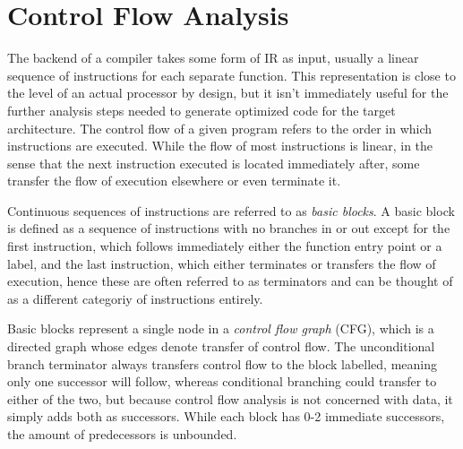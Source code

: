 \documentclass{article}
\begin{document}
\section{Control Flow Analysis}



The backend of a compiler takes some form of IR as input, usually a linear sequence of instructions for each separate function. This representation is close to the level of an actual processor by design, but it isn't immediately useful for the further analysis steps needed to generate optimized code for the target architecture. %
The control flow of a given program refers to the order in which instructions are executed. While the flow of most instructions is linear, in the sense that the next instruction executed is located immediately after, some transfer the flow of execution elsewhere or even terminate it. %


Continuous sequences of instructions are referred to as \textit{basic blocks}. A basic block is defined as a sequence of instructions with no branches in or out except for the first instruction, which follows immediately either the function entry point or a label,  and the last instruction, which either terminates or transfers the flow of execution, hence these are often referred to as terminators and can be thought of as a different categoriy of instructions entirely.

Basic blocks represent a single node in a \textit{control flow graph} (CFG), which is a directed graph whose edges denote transfer of  control flow. The unconditional branch terminator always transfers control flow to the block labelled, meaning only one successor will follow, whereas conditional branching could transfer to either of the two, but because control flow analysis is not concerned with data, it simply adds both as successors. %
While each block has 0-2 immediate successors, the amount of predecessors is unbounded.
\end{document}
